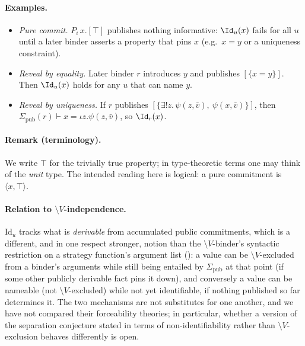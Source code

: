 \paragraph{Examples.}
\begin{itemize}
  \item \emph{Pure commit.} $P_i\,x.[\top]$ publishes nothing informative:
  $\Id_u(x)$ fails for all $u$ until a later binder asserts a property that pins
  $x$ (e.g.\ $x=y$ or a uniqueness constraint).
  \item \emph{Reveal by equality.} Later binder $r$ introduces $y$ and publishes
  $[\{x=y\}]$. Then $\Id_u(x)$ holds for any $u$ that can name $y$.
  \item \emph{Reveal by uniqueness.} If $r$ publishes $[\{\exists! z.\,\psi(z,\bar v),\ \psi(x,\bar v)\}]$,
  then $\Sigma_{\mathrm{pub}}(r)\vdash x = \iota z.\psi(z,\bar v)$, so $\Id_r(x)$.
\end{itemize}

\paragraph{Remark (terminology).}
We write $\top$ for the trivially true property; in type-theoretic terms one may
think of the \emph{unit} type. The intended reading here is logical: a pure
commitment is $\langle x, \top\rangle$.

\paragraph{Relation to $\setminus V$-independence.}
$\mathrm{Id}_u$ tracks what is \emph{derivable} from accumulated public
commitments, which is a different, and in one respect stronger, notion than
the $\setminus V$-binder's syntactic restriction on a strategy function's
argument list (): a value can be $\setminus
V$-excluded from a binder's arguments while still being entailed by
$\Sigma_{\mathrm{pub}}$ at that point (if some other publicly derivable fact
pins it down), and conversely a value can be nameable (not $\setminus
V$-excluded) while not yet identifiable, if nothing published so far
determines it. The two mechanisms are not substitutes for one another, and
we have not compared their forceability theories; in particular, whether a
version of the  separation conjecture
stated in terms of non-identifiability rather than $\setminus V$-exclusion
behaves differently is open.
